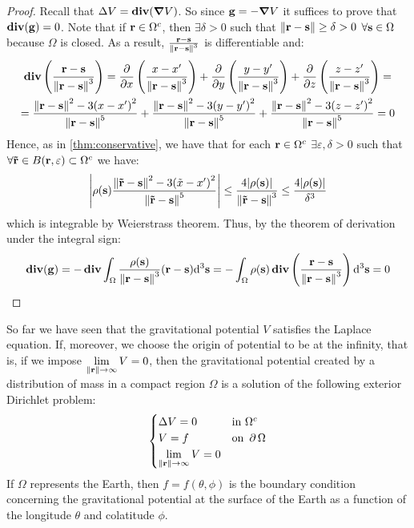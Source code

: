 \documentclass[../main.tex]{subfiles}
\begin{document}
\begin{proof}
  Recall that $\laplacian V=\div(\grad V)$. So since $\vf{g}=-\grad V$ it suffices to prove that $\div(\vf{g})=0$. Note that if $\vf{r}\in\Omega^c$, then $\exists \delta>0$ such that $\norm{\vf{r}-\vf{s}}\geq\delta>0$ $\forall \vf{s}\in\Omega$ because $\Omega$ is closed. As a result, $\frac{\vf{r}-\vf{s}}{\norm{\vf{r}-\vf{s}}^3}$ is differentiable and:
  \begin{multline*}
    \div\left(\frac{\vf{r}-\vf{s}}{\norm{\vf{r}-\vf{s}}^3}\right)=\pdv{}{x}\left(\frac{x-x'}{\norm{\vf{r}-\vf{s}}^3}\right)+\pdv{}{y}\left(\frac{y-y'}{\norm{\vf{r}-\vf{s}}^3}\right)+\pdv{}{z}\left(\frac{z-z'}{\norm{\vf{r}-\vf{s}}^3}\right)=\\
    =\frac{\norm{\vf{r}-\vf{s}}^2-3{(x-x')}^2}{\norm{\vf{r}-\vf{s}}^5}+\frac{\norm{\vf{r}-\vf{s}}^2-3{(y-y')}^2}{\norm{\vf{r}-\vf{s}}^5}+\frac{\norm{\vf{r}-\vf{s}}^2-3{(z-z')}^2}{\norm{\vf{r}-\vf{s}}^5} =0
  \end{multline*}
  Hence, as in \cref{thm:conservative}, we have that for each $\vf{r}\in\Omega^c$ $\exists\varepsilon,\delta>0$ such that $\forall \vf{\tilde{r}} \in B(\vf{r},\varepsilon)\subset\Omega^c$ we have:
  $$
    \abs{\rho(\vf{s})\frac{\norm{\vf{\tilde{r}}-\vf{s}}^2-3{(\tilde{x}-x')}^2}{\norm{\vf{\tilde{r}}-\vf{s}}^5}}\leq \frac{4\abs{\rho(\vf{s})}}{\norm{\vf{\tilde{r}}-\vf{s}}^3}\leq \frac{4\abs{\rho(\vf{s})}}{\delta^3}
  $$
  which is integrable by Weierstrass theorem. Thus, by the theorem of derivation under the integral sign:
  \begin{equation}
    \div(\vf{g})=-\div\int_\Omega\frac{\rho(\vf{s})}{\norm{\vf{r}-\vf{s}}^3}(\vf{r}-\vf{s})\dd^3{\vf{s}}=-\int_\Omega\rho(\vf{s})\div\left(\frac{\vf{r}-\vf{s}}{\norm{\vf{r}-\vf{s}}^3}\right)\dd^3{\vf{s}}=0
  \end{equation}
\end{proof}
So far we have seen that the gravitational potential $V$ satisfies the Laplace equation. If, moreover, we choose the origin of potential to be at the infinity, that is, if we impose $\displaystyle\lim_{\norm{\vf{r}}\to\infty}V=0$, then the gravitational potential created by a distribution of mass in a compact region $\Omega$ is a solution of the following exterior Dirichlet problem:
\begin{equation}\label{eq:dirichletProblem}
  \begin{cases}
    \laplacian V = 0 & \text{in } \Omega^c    \\
    V = f            & \text{on } \Fr{\Omega} \\
    \displaystyle\lim_{\norm{\vf{r}}\to\infty}V=0
  \end{cases}
\end{equation}
If $\Omega$ represents the Earth, then $f=f(\theta,\phi)$ is the boundary condition concerning the gravitational potential at the surface of the Earth as a function of the longitude $\theta$ and colatitude $\phi$.
\end{document}
